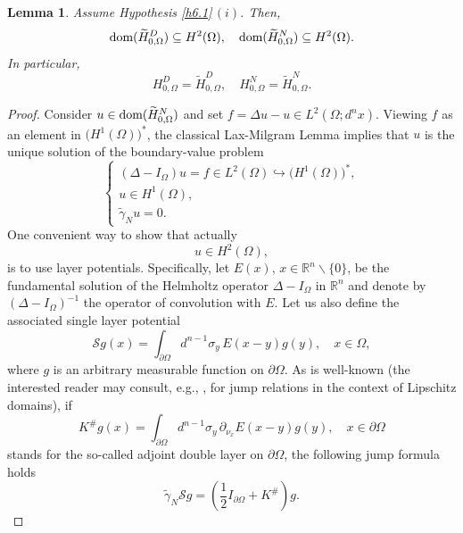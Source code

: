 \documentclass[reqno,10pt, centertags]{amsart}
\newcommand{\bbR}{{\mathbb{R}}}
\newcommand{\lb}{\label}
\newcommand{\wti}{\widetilde}
\newcommand{\Om}{\Omega}
\newcommand{\dOm}{{\partial\Omega}}
\newcommand{\dom}{\text{\rm{dom}}}
\numberwithin{equation}{section}
\newtheorem{lemma}[theorem]{Lemma}
\theoremstyle{definition}
\begin{document}
\begin{lemma} \lb{lA.1}
Assume Hypothesis \ref{h6.1}\,$(i)$. Then,
\begin{equation}
\dom(\wti H_{0,\Om}^D)\subseteq H^{2}(\Omega), \quad
 \dom(\wti H_{0,\Om}^N)\subseteq
H^{2}(\Omega).
\end{equation}
In particular,
\begin{equation}
H_{0,\Om}^D = \wti H_{0,\Om}^D, \quad
H_{0,\Om}^N = \wti H_{0,\Om}^N.
\end{equation}
\end{lemma}
\begin{proof}
Consider $u\in\dom(\wti H_{0,\Om}^N)$ and set $f=\Delta u-u\in
L^2(\Omega;d^nx)$. Viewing $f$ as an element in $\big(H^1(\Omega)\big)^*$,
the classical Lax-Milgram Lemma implies that $u$ is the unique solution of
the boundary-value problem
\begin{equation}\label{BVP}
\left\{
\begin{array}{l}
(\Delta -I_{\Omega})u=f\in L^2(\Omega)\hookrightarrow
\bigl(H^{1}(\Omega)\bigr)^*, \\
u\in H^{1}(\Omega), \\
\wti\gamma_N u=0.
\end{array}
\right.
\end{equation}
One convenient way to show that actually
\begin{equation}\label{goal}
u\in H^{2}(\Omega),
\end{equation}
is to use layer potentials. Specifically, let $E(x)$,
$x\in\bbR^n\backslash\{0\}$, be the fundamental solution of the
Helmholtz operator $\Delta -I_{\Omega}$ in $\bbR^n$ and denote by
$(\Delta-I_{\Omega})^{-1}$ the operator of convolution with $E$. Let us
also define the associated single layer potential
\begin{equation}\label{sing-layer}
{\mathcal
S}g(x)=\int_{\partial\Omega}d^{n-1}\sigma_y\,E(x-y)g(y),\quad
x\in\Omega,
\end{equation}
where $g$ is an arbitrary measurable function on $\partial\Omega$. As
is well-known (the interested reader may consult, e.g., \cite{MMT01},
\cite{Ve84} for jump relations in the context of Lipschitz domains), if
\begin{equation}\label{Ksharp}
K^{\#}g(x)=\int_{\partial\Omega}d^{n-1}\sigma_y\,\partial_{\nu_x}E(x-y)g(y),
\quad x\in\partial\Omega
\end{equation}
stands for the so-called adjoint double layer on $\partial\Omega$,
the following jump formula holds
\begin{equation}\label{jump}
\wti\gamma_N {\mathcal S}g=({\textstyle{\frac12}}I_\dOm+K^{\#})g.
\end{equation}


\end{proof}
\end{document}
